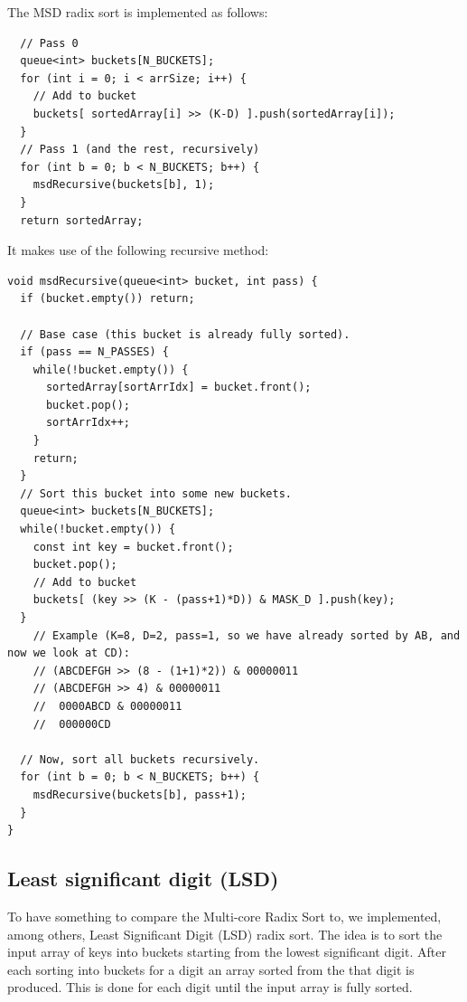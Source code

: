 The MSD radix sort is implemented as follows:
\begin{verbatim}
  // Pass 0
  queue<int> buckets[N_BUCKETS];
  for (int i = 0; i < arrSize; i++) {
    // Add to bucket
    buckets[ sortedArray[i] >> (K-D) ].push(sortedArray[i]);
  }
  // Pass 1 (and the rest, recursively)
  for (int b = 0; b < N_BUCKETS; b++) {
    msdRecursive(buckets[b], 1);
  }
  return sortedArray;
\end{verbatim}


It makes use of the following recursive method:
\begin{verbatim}
void msdRecursive(queue<int> bucket, int pass) {
  if (bucket.empty()) return;
  
  // Base case (this bucket is already fully sorted).
  if (pass == N_PASSES) {
    while(!bucket.empty()) {
      sortedArray[sortArrIdx] = bucket.front();
      bucket.pop();
      sortArrIdx++;
    }
    return;
  }
  // Sort this bucket into some new buckets.
  queue<int> buckets[N_BUCKETS];
  while(!bucket.empty()) {
    const int key = bucket.front();
    bucket.pop();
    // Add to bucket
    buckets[ (key >> (K - (pass+1)*D)) & MASK_D ].push(key);
  }
    // Example (K=8, D=2, pass=1, so we have already sorted by AB, and now we look at CD):
    // (ABCDEFGH >> (8 - (1+1)*2)) & 00000011
    // (ABCDEFGH >> 4) & 00000011
    //  0000ABCD & 00000011
    //  000000CD

  // Now, sort all buckets recursively.
  for (int b = 0; b < N_BUCKETS; b++) {
    msdRecursive(buckets[b], pass+1);
  }
}
\end{verbatim}



\subsection{Least significant digit (LSD)}
To have something to compare the Multi-core Radix Sort to, we implemented, among others, Least Significant Digit (LSD) radix sort. 
The idea is to sort the input array of keys into buckets starting from the lowest significant digit. After each sorting into buckets for a digit an array sorted from the that digit is produced. 
This is done for each digit until the input array is fully sorted. 

